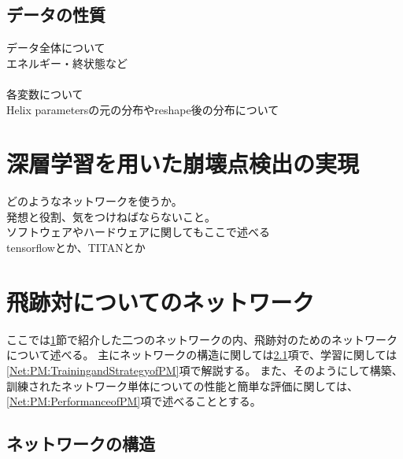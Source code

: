 \subsection{データの性質} \label{Net:Data:DataProperty}

データ全体について\\
エネルギー・終状態など\\
\\
各変数について\\
Helix parametersの元の分布やreshape後の分布について\\

\section{深層学習を用いた崩壊点検出の実現} \label{Net:forVertexFinderwithDL}

どのようなネットワークを使うか。\\
発想と役割、気をつけねばならないこと。\\

ソフトウェアやハードウェアに関してもここで述べる\\
tensorflowとか、TITANとか\\


\section{飛跡対についてのネットワーク} \label{Net:PairModel}

ここでは\ref{Net:forVertexFinderwithDL}節で紹介した二つのネットワークの内、飛跡対のためのネットワークについて述べる。
主にネットワークの構造に関しては\ref{Net:PM:StructureofPM}項で、学習に関しては\ref{Net:PM:TrainingandStrategyofPM}項で解説する。
また、そのようにして構築、訓練されたネットワーク単体についての性能と簡単な評価に関しては、\ref{Net:PM:PerformanceofPM}項で述べることとする。

\subsection{ネットワークの構造} \label{Net:PM:StructureofPM}

